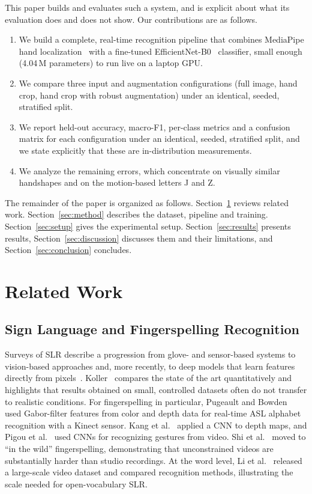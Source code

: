 \documentclass[conference]{IEEEtran}
\begin{document}
This paper builds and evaluates such a system, and is explicit about what its evaluation does and does not show. Our contributions are as follows.
\begin{enumerate}
\item We build a complete, real-time recognition pipeline that combines MediaPipe hand localization~\cite{zhang2020mediapipe} with a fine-tuned EfficientNet-B0~\cite{tan2019efficientnet} classifier, small enough (4.04\,M parameters) to run live on a laptop GPU.
\item We compare three input and augmentation configurations (full image, hand crop, hand crop with robust augmentation) under an identical, seeded, stratified split.
\item We report held-out accuracy, macro-F1, per-class metrics and a confusion matrix for each configuration under an identical, seeded, stratified split, and we state explicitly that these are in-distribution measurements.
\item We analyze the remaining errors, which concentrate on visually similar handshapes and on the motion-based letters J and Z.
\end{enumerate}

The remainder of the paper is organized as follows. Section~\ref{sec:related} reviews related work. Section~\ref{sec:method} describes the dataset, pipeline and training. Section~\ref{sec:setup} gives the experimental setup. Section~\ref{sec:results} presents results, Section~\ref{sec:discussion} discusses them and their limitations, and Section~\ref{sec:conclusion} concludes.

\section{Related Work}
\label{sec:related}
\subsection{Sign Language and Fingerspelling Recognition}
Surveys of SLR describe a progression from glove- and sensor-based systems to vision-based approaches and, more recently, to deep models that learn features directly from pixels~\cite{cheok2019review,rastgoo2021survey}. Koller~\cite{koller2020quantitative} compares the state of the art quantitatively and highlights that results obtained on small, controlled datasets often do not transfer to realistic conditions. For fingerspelling in particular, Pugeault and Bowden~\cite{pugeault2011spelling} used Gabor-filter features from color and depth data for real-time ASL alphabet recognition with a Kinect sensor. Kang et al.~\cite{kang2015realtime} applied a CNN to depth maps, and Pigou et al.~\cite{pigou2014sign} used CNNs for recognizing gestures from video. Shi et al.~\cite{shi2018fingerspelling} moved to ``in the wild'' fingerspelling, demonstrating that unconstrained videos are substantially harder than studio recordings. At the word level, Li et al.~\cite{li2020word} released a large-scale video dataset and compared recognition methods, illustrating the scale needed for open-vocabulary SLR.
\end{document}
